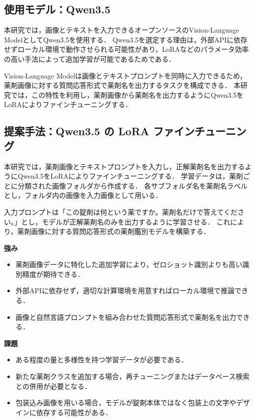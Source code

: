 \documentclass{ltjsarticle}
\begin{document}
\subsection{使用モデル：Qwen3.5}

本研究では，画像とテキストを入力できるオープンソースのVision-Language ModelとしてQwen3.5を使用する．
Qwen3.5を選定する理由は，外部APIに依存せずローカル環境で動作させられる可能性があり，LoRAなどのパラメータ効率の高い手法によって追加学習が可能であるためである．

Vision-Language Modelは画像とテキストプロンプトを同時に入力できるため，薬剤画像に対する質問応答形式で薬剤名を出力するタスクを構成できる．
本研究では，この特性を利用し，薬剤画像から薬剤名を出力するようにQwen3.5をLoRAによりファインチューニングする．

\subsection{提案手法：Qwen3.5 の LoRA ファインチューニング}

本研究では，薬剤画像とテキストプロンプトを入力し，正解薬剤名を出力するようにQwen3.5をLoRAによりファインチューニングする．
学習データは，薬剤ごとに分類された画像フォルダから作成する．
各サブフォルダ名を薬剤名ラベルとし，フォルダ内の画像を入力画像として用いる．

入力プロンプトは「この錠剤は何という薬ですか。薬剤名だけで答えてください。」とし，モデルが正解薬剤名のみを出力するように学習させる．
これにより，薬剤画像に対する質問応答形式の薬剤鑑別モデルを構築する．

\textbf{強み}
\begin{itemize}
  \item 薬剤画像データに特化した追加学習により，ゼロショット識別よりも高い識別精度が期待できる．
  \item 外部APIに依存せず，適切な計算環境を用意すればローカル環境で推論できる．
  \item 画像と自然言語プロンプトを組み合わせた質問応答形式で薬剤名を出力できる．
\end{itemize}

\textbf{課題}
\begin{itemize}
  \item ある程度の量と多様性を持つ学習データが必要である．
  \item 新たな薬剤クラスを追加する場合，再チューニングまたはデータベース検索との併用が必要となる．
  \item 包装込み画像を用いる場合，モデルが錠剤本体ではなく包装上の文字やデザインに依存する可能性がある．
\end{itemize}
\end{document}
